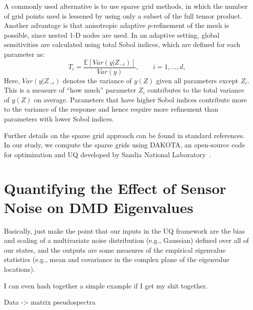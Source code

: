 \documentclass{aiaa-tc}%
\begin{document}
A commonly used alternative is to use sparse grid methods\cite{Smolyak}, in
which the number of grid points used is lessened by using only a subset of the
full tensor product.
%
Another advantage is that anisotropic
adaptive $p$-refinement of the mesh is possible, since nested 1-D
nodes are used. In an adaptive setting, global sensitivities are
calculated using total Sobol indices, which are defined for each
parameter as:
\begin{equation}
T_i = \frac{\mathbb{E} [ Var(y|Z_{-i}) ]}{Var(y)},\qquad i = 1,\ldots,d,
\label{eq:sobol}
\end{equation}
Here,
$Var(y|Z_{-i})$ denotes the variance of $y(Z)$ given all parameters
except $Z_i$. This is a measure of ``how much'' parameter $Z_i$
contributes to the total variance of $y(Z)$ on average. Parameters
that have higher Sobol indices contribute more to the variance of the
response and hence require more refinement than parameters with lower
Sobol indices.

Further details on the sparse grid approach can be found in standard
references\cite{lemaitre,Gerstner:SparseGrids}. In our study, we compute the
sparse grids using DAKOTA, an
open-source code for optimization and UQ developed by Sandia National
Laboratory~\cite{Dakota}.

\section{Quantifying the Effect of Sensor Noise on DMD Eigenvalues}

Basically, just make the point that our inputs in the UQ framework are
the bias and scaling of a multivariate noise distribution (e.g.,
Gaussian) defined over all of our states, and the outputs are some
measures of the empirical eigenvalue statistics (e.g., mean and
covariance in the complex plane of the eigenvalue locations).

I can even hash together a simple example if I get my shit together.


Data -> matrix pseudospectra

\awxruib


\end{document}

